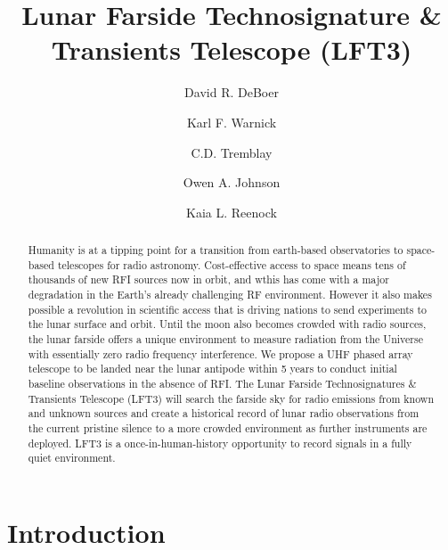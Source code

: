 \documentclass[preprint]{aastex631}
\begin{document}
\title{Lunar Farside Technosignature \& Transients Telescope (LFT3)}

\author[0000-0003-3197-2294]{David R. DeBoer}
\author[0000-0002-0387-6476]{Karl F. Warnick}
\author[0000-0002-4409-3515]{C.D. Tremblay}
\author[0000-0002-5927-0481]{Owen A. Johnson}
\author[0009-0008-0410-1833]{Kaia L. Reenock}

\begin{abstract}
Humanity is at a tipping point for a transition from earth-based observatories to space-based telescopes for radio astronomy. Cost-effective access to space means tens of thousands of new RFI sources now in orbit, and wthis has come with a major degradation in the Earth’s already challenging RF environment. However it also makes possible a revolution in scientific access that is driving nations to send experiments to the lunar surface and orbit. Until the moon also becomes crowded with radio sources, the lunar farside offers a unique environment to measure radiation from the Universe with essentially zero radio frequency interference. We propose a UHF phased array telescope to be landed near the lunar antipode within 5 years to conduct initial baseline observations in the absence of RFI. The Lunar Farside Technosignatures \& Transients Telescope (LFT3) will search the farside sky for radio emissions from known and unknown sources and create a historical record of lunar radio observations from the current pristine silence to a more crowded environment as further instruments are deployed. LFT3 is a once-in-human-history opportunity to record signals in a fully quiet environment. 

\end{abstract}

\section{Introduction} 
\label{sec:intro}

\end{document}

